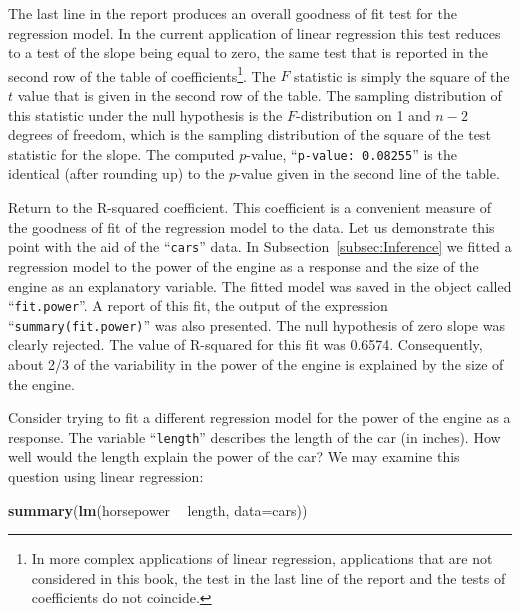 \documentclass[]{krantz}
\makeatletter
\newenvironment{Shaded}{\begin{snugshade}}{\end{snugshade}}
\newcommand{\KeywordTok}[1]{\textcolor[rgb]{0.13,0.29,0.53}{\textbf{#1}}}
\newcommand{\DataTypeTok}[1]{\textcolor[rgb]{0.13,0.29,0.53}{#1}}
\newcommand{\StringTok}[1]{\textcolor[rgb]{0.31,0.60,0.02}{#1}}
\newcommand{\OperatorTok}[1]{\textcolor[rgb]{0.81,0.36,0.00}{\textbf{#1}}}
\newcommand{\NormalTok}[1]{#1}
\newenvironment{kframe}{%
\medskip{}
\setlength{\fboxsep}{.8em}
 \def\at@end@of@kframe{}%
 \ifinner\ifhmode%
  \def\at@end@of@kframe{\end{minipage}}%
  \begin{minipage}{\columnwidth}%
 \fi\fi%
 \def\FrameCommand##1{\hskip\@totalleftmargin \hskip-\fboxsep
 \colorbox{shadecolor}{##1}\hskip-\fboxsep
     \hskip-\linewidth \hskip-\@totalleftmargin \hskip\columnwidth}%
 \MakeFramed {\advance\hsize-\width
   \@totalleftmargin\z@ \linewidth\hsize
   \@setminipage}}%
 {\par\unskip\endMakeFramed%
 \at@end@of@kframe}
\renewenvironment{Shaded}{\begin{kframe}}{\end{kframe}}
\theoremstyle{definition}
\theoremstyle{definition}
\theoremstyle{definition}
\theoremstyle{remark}
\makeatother
\begin{document}
The last line in the report produces an overall goodness of fit test for
the regression model. In the current application of linear regression
this test reduces to a test of the slope being equal to zero, the same
test that is reported in the second row of the table of
coefficients\footnote{In more complex applications of linear regression,
  applications that are not considered in this book, the test in the
  last line of the report and the tests of coefficients do not coincide.}.
The \(F\) statistic is simply the square of the \(t\) value that is
given in the second row of the table. The sampling distribution of this
statistic under the null hypothesis is the \(F\)-distribution on 1 and
\(n-2\) degrees of freedom, which is the sampling distribution of the
square of the test statistic for the slope. The computed \(p\)-value,
``\texttt{p-value:\ 0.08255}'' is the identical (after rounding up) to
the \(p\)-value given in the second line of the table.

Return to the R-squared coefficient. This coefficient is a convenient
measure of the goodness of fit of the regression model to the data. Let
us demonstrate this point with the aid of the ``\texttt{cars}'' data. In
Subsection~\ref{subsec:Inference} we fitted a regression model to the
power of the engine as a response and the size of the engine as an
explanatory variable. The fitted model was saved in the object called
``\texttt{fit.power}''. A report of this fit, the output of the
expression ``\texttt{summary(fit.power)}'' was also presented. The null
hypothesis of zero slope was clearly rejected. The value of R-squared
for this fit was 0.6574. Consequently, about 2/3 of the variability in
the power of the engine is explained by the size of the engine.

Consider trying to fit a different regression model for the power of the
engine as a response. The variable ``\texttt{length}'' describes the
length of the car (in inches). How well would the length explain the
power of the car? We may examine this question using linear regression:

\begin{Shaded}
\begin{Highlighting}[]
\KeywordTok{summary}\NormalTok{(}\KeywordTok{lm}\NormalTok{(horsepower }\OperatorTok{~}\StringTok{ }\NormalTok{length, }\DataTypeTok{data=}\NormalTok{cars))}
\end{Highlighting}
\end{Shaded}
\end{document}
